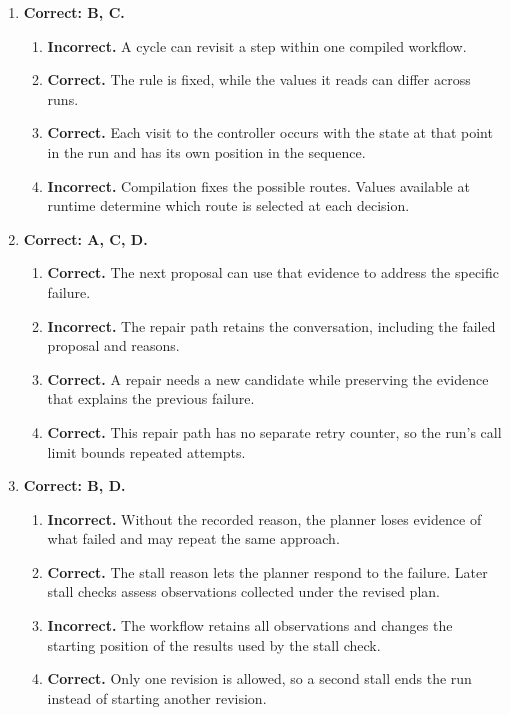 \begin{enumerate}[start=21,itemsep=0.7\baselineskip]
\item[{\hyperref[exercise:24]{24.}}] \begin{minipage}[t]{\linewidth}
\textbf{Correct: B, C.}
\begin{enumerate}[label=\textnormal{(\Alph*)},leftmargin=*,itemsep=0pt]
\item \textbf{Incorrect.} A cycle can revisit a step within one compiled workflow.
\item \textbf{Correct.} The rule is fixed, while the values it reads can differ across runs.
\item \textbf{Correct.} Each visit to the controller occurs with the state at that point in the run and has its own position in the sequence.
\item \textbf{Incorrect.} Compilation fixes the possible routes. Values available at runtime determine which route is selected at each decision.
\end{enumerate}
\end{minipage}

\item[{\hyperref[exercise:25]{25.}}] \begin{minipage}[t]{\linewidth}
\textbf{Correct: A, C, D.}
\begin{enumerate}[label=\textnormal{(\Alph*)},leftmargin=*,itemsep=0pt]
\item \textbf{Correct.} The next proposal can use that evidence to address the specific failure.
\item \textbf{Incorrect.} The repair path retains the conversation, including the failed proposal and reasons.
\item \textbf{Correct.} A repair needs a new candidate while preserving the evidence that explains the previous failure.
\item \textbf{Correct.} This repair path has no separate retry counter, so the run's call limit bounds repeated attempts.
\end{enumerate}
\end{minipage}

\item[{\hyperref[exercise:26]{26.}}] \begin{minipage}[t]{\linewidth}
\textbf{Correct: B, D.}
\begin{enumerate}[label=\textnormal{(\Alph*)},leftmargin=*,itemsep=0pt]
\item \textbf{Incorrect.} Without the recorded reason, the planner loses evidence of what failed and may repeat the same approach.
\item \textbf{Correct.} The stall reason lets the planner respond to the failure. Later stall checks assess observations collected under the revised plan.
\item \textbf{Incorrect.} The workflow retains all observations and changes the starting position of the results used by the stall check.
\item \textbf{Correct.} Only one revision is allowed, so a second stall ends the run instead of starting another revision.
\end{enumerate}
\end{minipage}


\end{enumerate}
